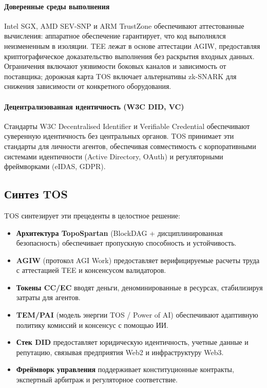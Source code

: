 \documentclass[11pt]{article}
\begin{document}
\paragraph{Доверенные среды выполнения} Intel SGX, AMD SEV-SNP и ARM TrustZone обеспечивают аттестованные вычисления: аппаратное обеспечение гарантирует, что код выполнялся неизмененным в изоляции. TEE лежат в основе аттестации AGIW, предоставляя криптографическое доказательство выполнения без раскрытия входных данных. Ограничения включают уязвимости боковых каналов и зависимость от поставщика; дорожная карта TOS включает альтернативы zk-SNARK для снижения зависимости от конкретного оборудования.

\paragraph{Децентрализованная идентичность (W3C DID, VC)} Стандарты W3C Decentralised Identifier и Verifiable Credential обеспечивают суверенную идентичность без центральных органов. TOS принимает эти стандарты для личности агентов, обеспечивая совместимость с корпоративными системами идентичности (Active Directory, OAuth) и регуляторными фреймворками (eIDAS, GDPR).

\subsection{Синтез TOS}
TOS синтезирует эти прецеденты в целостное решение:
\begin{itemize}[noitemsep]
  \item \textbf{Архитектура TopoSpartan} (BlockDAG + дисциплинированная безопасность) обеспечивает пропускную способность и устойчивость.
  \item \textbf{AGIW} (протокол AGI Work) предоставляет верифицируемые расчеты труда с аттестацией TEE и консенсусом валидаторов.
  \item \textbf{Токены CC/EC} вводят деньги, деноминированные в ресурсах, стабилизируя затраты для агентов.
  \item \textbf{TEM/PAI} (модель энергии TOS / Power of AI) обеспечивают адаптивную политику комиссий и консенсус с помощью ИИ.
  \item \textbf{Стек DID} предоставляет юридическую идентичность, учетные данные и репутацию, связывая предприятия Web2 и инфраструктуру Web3.
  \item \textbf{Фреймворк управления} поддерживает конституционные контракты, экспертный арбитраж и регуляторное соответствие.
\end{itemize}
\end{document}
